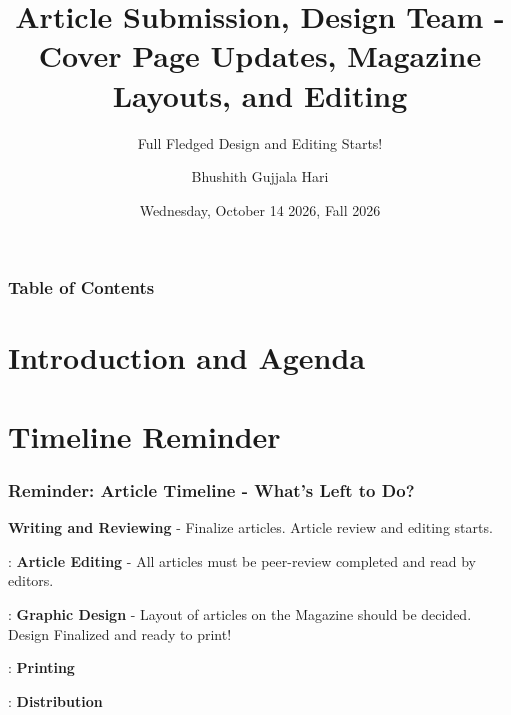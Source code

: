 \documentclass{beamer}
\title[NestedOwls CS Magazine]{Article Submission, Design Team - Cover Page Updates, Magazine Layouts, and Editing}
\subtitle{Full Fledged Design and Editing Starts!}
\author{Bhushith Gujjala Hari}
\institute{Temple University Japan}
\date[Fall 2026]{Wednesday, October 14 2026, Fall 2026}
\begin{document}



\frame{\titlepage}


\begin{frame}
    \frametitle{Table of Contents}
    \tableofcontents
\end{frame}


\section{Introduction and Agenda}
\begin{frame}

\end{frame}


\section{Timeline Reminder}
\begin{frame}
    \frametitle{Reminder: Article Timeline - What's Left to Do?}

        \begin{description}
            \item<1->[September 30 to \textbf{October 14}] \textbf{Writing and Reviewing} - Finalize articles. Article review and editing starts.

            \item<2->[October 14 to October 18]: \textbf{Article Editing} - All articles must be peer-review completed and read by editors.

            \item<3->[October 18 to October 25]: \textbf{Graphic Design} - Layout of articles on the Magazine should be decided. Design Finalized and ready to print! 

            \item<4->[October 26 to October 30]: \textbf{Printing}

            \item<5->[November 2 to November 20]: \textbf{Distribution} 
        \end{description}   
\end{frame}
\end{document}
